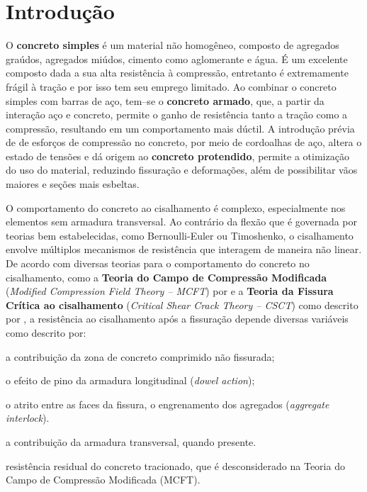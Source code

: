 \chapter[Introdução]{Introdução}

O \textbf{concreto simples} é um material não homogêneo, composto de agregados graúdos, agregados miúdos, cimento como aglomerante e água. É um excelente composto dada a sua alta resistência à compressão, entretanto é extremamente frágil à tração e por isso tem seu emprego limitado. Ao combinar o concreto simples com barras de aço, tem--se o \textbf{concreto armado}, que, a partir da interação aço e concreto, permite o ganho de resistência tanto a tração como a compressão, resultando em um comportamento mais dúctil. A introdução prévia de de esforços de compressão no concreto, por meio de cordoalhas de aço, altera o estado de tensões e dá origem ao \textbf{concreto protendido}, permite a otimização do uso do material, reduzindo fissuração e deformações, além de possibilitar vãos maiores e seções mais esbeltas.\cite{Araujo2023}

O comportamento do concreto ao cisalhamento é complexo, especialmente nos elementos sem armadura transversal. Ao contrário da flexão que é governada por teorias bem estabelecidas, como Bernoulli-Euler ou Timoshenko, o cisalhamento envolve múltiplos mecanismos de resistência que interagem de maneira não linear. De acordo com diversas teorias para o comportamento do concreto no cisalhamento, como a \textbf{Teoria do Campo de Compressão Modificada} (\textit{Modified Compression Field Theory -- MCFT}) por \textcite{Vecchio1986} e a \textbf{Teoria da Fissura Crítica ao cisalhamento} (\textit{Critical Shear Crack Theory -- CSCT}) como descrito por \textcite{Muttoni2023}, a resistência ao cisalhamento após a fissuração depende diversas variáveis como descrito por:

\begin{alineas}
\item a contribuição da zona de concreto comprimido não fissurada;
\item o efeito de pino da armadura longitudinal (\textit{dowel action});
\item o atrito entre as faces da fissura, o engrenamento dos agregados (\textit{aggregate interlock}).
\item a contribuição da armadura transversal, quando presente.
\item resistência residual do concreto tracionado, que é desconsiderado na Teoria do Campo de Compressão Modificada (MCFT).
\end{alineas}

